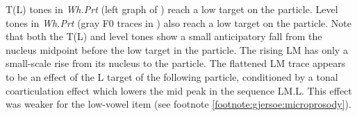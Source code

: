 \documentclass[output=paper,newtxmath,modfonts,nonflat,hidelinks]{langsci/langscibook}
\begin{document}
T(L) tones in \textit{Wh.Prt} (left graph of ) reach a low target on the particle.
Level tones in \textit{Wh.Prt} (gray F0 traces in ) also reach a low target on the particle.
Note that both the T(L) and level tones show a small anticipatory fall from the nucleus midpoint before the low target in the particle.
The rising  LM has only a small-scale rise from its nucleus to the particle.
The flattened LM trace appears to be an effect of the L target of the following particle, conditioned by a tonal coarticulation effect which lowers the mid peak in the sequence LM.L.
This effect was weaker for the low-vowel item (see footnote \ref{footnote:gjersoe:microprosody}).
\end{document}
